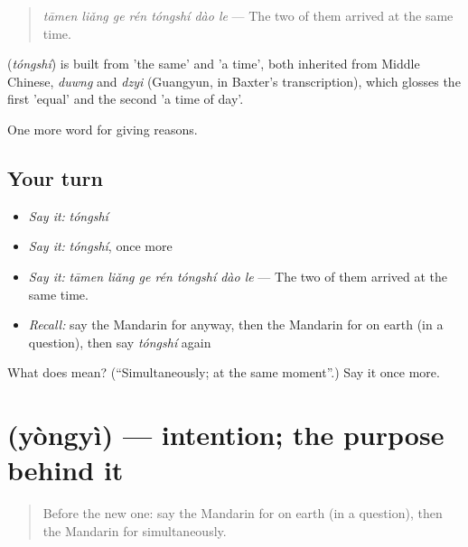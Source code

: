 \begin{quote}
\textbf{} \emph{tāmen liǎng ge rén tóngshí dào le} — The two of them arrived at the same time.
\end{quote}

\begin{cousinweb}
\textbf{} (\emph{tóngshí}) is built from  'the same' and  'a time', both inherited from Middle Chinese, \emph{duwng} and \emph{dzyi} (Guangyun, in Baxter's transcription), which glosses the first 'equal' and the second 'a time of day'.
\end{cousinweb}

\begin{grammarlens}[title={What you've built}]
One more word for giving reasons.
\end{grammarlens}

\subsection*{Your turn}
\begin{itemize}
\raggedright
  \item \emph{Say it:} \emph{tóngshí}
  \item \emph{Say it:} \emph{tóngshí}, once more
  \item \emph{Say it:} \emph{tāmen liǎng ge rén tóngshí dào le} — The two of them arrived at the same time.
  \item \emph{Recall:} say the Mandarin for anyway, then the Mandarin for on earth (in a question), then say \emph{tóngshí} again
\end{itemize}

\begin{tcolorbox}[breakable,colback=teal!4,colframe=teal!35!black,title={Before you move on}]
What does  mean? (\textquotedblleft{}Simultaneously; at the same moment\textquotedblright{}.) Say it once more.
\end{tcolorbox}
\section[\texorpdfstring{\zh{用意} (yòngyì)}{用意 (yòngyì)}]{ (yòngyì) — intention; the purpose behind it}

\label{lesson:ZH-C372-yongyi}



\begin{quote}
Before the new one: say the Mandarin for on earth (in a question), then the Mandarin for simultaneously.
\end{quote}

